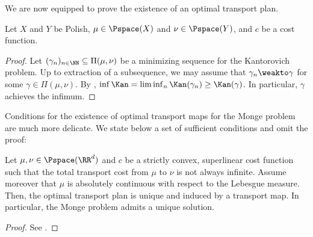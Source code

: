 \documentclass[oneside,reqno,letterpaper]{amsart}
\begin{document}
We are now equipped to prove the existence of an optimal transport plan.
\begin{theorem}[Kantorovich]\label{prop:Kan-existence}
  Let \(X\) and \(Y\) be Polish, \(\mu \in \Pspace(X)\) and \(\nu \in \Pspace(Y)\), and \(c\) be a \lsc cost function.
\end{theorem}
\begin{proof}
  Let \((\gamma_n)_{n \in \NN} \subseteq \Pi(\mu, \nu)\) be a minimizing sequence for the Kantorovich problem.
  Up to extraction of a subsequence, we may assume that \(\gamma_n \weakto \gamma\) for some \(\gamma \in \Pi(\mu, \nu)\).
  By , \(\inf \Kan = \liminf_n \Kan(\gamma_n) \geq \Kan(\gamma)\).
  In particular, \(\gamma\) achieves the infimum.
\end{proof}


Conditions for the existence of optimal transport maps for the Monge problem are much more delicate.
We state below a set of sufficient conditions and omit the proof:
\begin{theorem}\label{prop:Mon-existence}
  Let \(\mu, \nu \in \Pspace(\RR^d)\) and \(c\) be a strictly convex, superlinear cost function such that the total transport cost from \(\mu\) to \(\nu\) is not always infinite.
  Assume moreover that \(\mu\) is absolutely continuous with respect to the Lebesgue measure.
  Then, the optimal transport plan is unique and induced by a transport map.
  In particular, the Monge problem admits a unique solution.
\end{theorem}
\begin{proof}
  See \cite[Theorem 2.44]{Villani2003}.
\end{proof}
\end{document}
